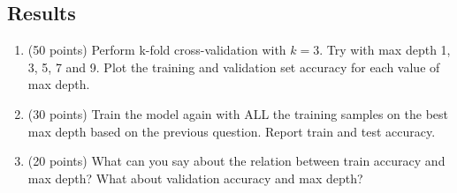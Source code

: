 \documentclass{article}
\begin{document}
\subsection{Results}
\begin{enumerate}[a]
\item (50 points) Perform k-fold cross-validation with $k=3$. Try with max depth 1, 3, 5, 7 and 9. Plot the training and validation set accuracy for each value of max depth.
\item (30 points) Train the model again with ALL the training samples on the best max depth based on the previous question. Report train and test accuracy.
\item (20 points) What can you say about the relation between train accuracy and max depth? What about validation accuracy and max depth?


\end{enumerate}
\end{document}
